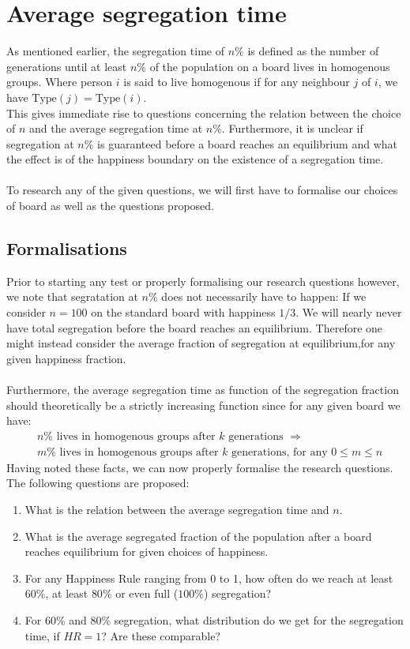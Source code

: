 
\section{Average segregation time}
	As mentioned earlier, the segregation time of \(n\%\) is defined as the number of generations until at least \(n\%\) of the population on a board lives in homogenous groups. 
Where person \(i\) is said to live homogenous if for any neighbour \(j\) of \(i\), we have \(\text{Type}(j)=\text{Type}(i)\).\\
This gives immediate rise to questions concerning the relation between the choice of \(n\) and the average segregation time at \(n\%\). 
Furthermore, it is unclear if segregation at \(n\%\) is guaranteed before a board reaches an equilibrium and what the effect is of the happiness boundary on the existence of a segregation time.\\
\\
To research any of the given questions, we will first have to formalise our choices of board as well as the questions proposed.\\


\subsection{Formalisations}
Prior to starting any test or properly formalising our research questions however, we note that segratation at \(n\%\) does not necessarily have to happen: 
If we consider \(n=100\) on the standard board with happiness \(1/3\). We will nearly never have total segregation before the board reaches an equilibrium.
Therefore one might instead consider the average fraction of segregation at equilibrium,for any given happiness fraction. \\
\\
Furthermore, the average segregation time as function of the segregation fraction should theoretically be a strictly increasing function since for any given board we have:
\begin{align*}
&n\% \text{ lives in homogenous groups after } k \text{ generations } \Rightarrow\\
& m\% \text{ lives in homogenous groups after } k \text{ generations, for any } 0 \leq m \leq n
\end{align*} 
Having noted these facts, we can now properly formalise the research questions.\\
The following questions are proposed:
\begin{enumerate}
 \item What is the relation between the average segregation time and \(n\).
 \item What is the average segregated fraction of the population after a board reaches equilibrium for given choices of happiness.
 \item For any Happiness Rule ranging from 0 to 1, how often do we reach at least $60\%$, at least $80\%$ or even full ($100\%$) segregation?
 \item For $60\%$ and $80\%$ segregation, what distribution do we get for the segregation time, if $HR = 1$? Are these comparable?
\end{enumerate}

